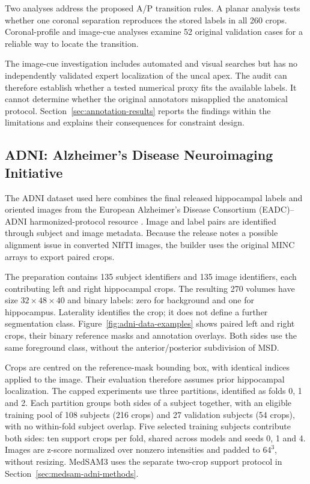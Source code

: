 \documentclass[12pt,a4paper]{article}
\begin{document}
Two analyses address the proposed A/P transition rules. A planar analysis tests
whether one coronal separation reproduces the stored labels in all
260 crops. Coronal-profile and image-cue analyses examine 52 original
validation cases for a reliable way to locate the transition.

The image-cue investigation includes automated and visual searches but
has no independently validated expert localization of the uncal apex.
The audit can therefore establish whether a tested numerical proxy fits
the available labels. It cannot determine whether the original annotators
misapplied the anatomical protocol. Section~\ref{sec:annotation-results}
reports the findings within the limitations and explains their
consequences for constraint design.


\subsection{ADNI: Alzheimer's Disease Neuroimaging Initiative}
\label{sec:adni-methods}


The ADNI dataset used here combines the final released hippocampal labels
and oriented images from the European Alzheimer's Disease Consortium
(EADC)--ADNI harmonized-protocol resource
\cite{harpReleasedLabels}. Image and label pairs are identified through
subject and image metadata. Because the release notes a possible
alignment issue in converted NIfTI images, the builder uses the
original MINC arrays to export paired crops.

The preparation contains 135 subject identifiers and 135 image
identifiers, each contributing left and right hippocampal crops.
The resulting 270 volumes have size $32\times48\times40$ and binary
labels: zero for background and one for hippocampus. Laterality
identifies the crop; it does not define a further segmentation class.
Figure~\ref{fig:adni-data-examples} shows paired left and right crops,
their binary reference masks and annotation overlays. Both sides use
the same foreground class, without the anterior/posterior subdivision
of MSD.


Crops are centred on the reference-mask bounding box, with identical
indices applied to the image. Their evaluation therefore assumes prior
hippocampal localization. The capped experiments use three partitions,
identified as folds 0, 1 and 2. Each partition groups both sides of a
subject together, with an eligible training pool of 108 subjects
(216 crops) and 27 validation subjects (54 crops), with no within-fold
subject overlap. Five selected training subjects contribute both sides:
ten support crops per fold, shared across models and seeds 0, 1 and 4.
Images are
z-score normalized over nonzero intensities and padded to $64^3$,
without resizing. MedSAM3 uses the separate
two-crop support protocol in Section~\ref{sec:medsam-adni-methods}.
\end{document}
